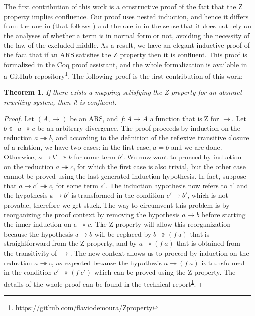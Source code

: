 \documentclass[a4paper]{article}
\newcommand{\tto}{\twoheadrightarrow}
\newcommand{\ott}{\twoheadleftarrow}
\newtheorem{theorem}{Theorem}[section]
\begin{document}
The first contribution of this work is a constructive proof of the
fact that the Z property implies confluence. Our proof uses nested
induction, and hence it differs from the one in \cite{kes09} (that
follows \cite{dehornoy2008z}) and the one in \cite{zproperty} in the
sense that it does not rely on the analyses of whether a term is in
normal form or not, avoiding the necessity of the law of the excluded
middle. As a result, we have an elegant inductive proof of the fact
that if an ARS satisfies the Z property then it is confluent. This
proof is formalized in the Coq proof assistant, and the whole
formalization is available in a GitHub
repository\footnote{\label{fn:github}\url{https://github.com/flaviodemoura/Zproperty}}. The
following proof is the first contribution of this work:
\begin{theorem}\cite{dehornoy2008z}
  If there exists a mapping satisfying the Z property for an abstract
  rewriting system, then it is confluent.
\end{theorem}
\begin{proof}
  Let $(A,\to)$ be an ARS, and $f: A \to A$ a function that is Z for
  $\to$. Let $b \ott a \tto c$ be an arbitrary divergence. The proof
  proceeds by induction on the reduction $a \tto b$, and according to
  the definition of the reflexive transitive closure of a relation, we
  have two cases: in the first case, $a=b$ and we are done. Otherwise,
  $a \to b' \tto b$ for some term $b'$. We now want to proceed by
  induction on the reduction $a \tto c$, for which the first case is
  also trivial, but the other case cannot be proved using the last
  generated induction hypothesis. In fact, suppose that
  $a \to c' \tto c$, for some term $c'$. The induction hypothesis now
  refers to $c'$ and the hypothesis $a \to b'$ is transformed in the
  condition $c' \to b'$, which is not provable, therefore we get
  stuck. The way to circumvent this problem is by reorganizing the
  proof context by removing the hypothesis $a \to b$ before starting
  the inner induction on $a \tto c$. The Z property will allow this
  reorganization because the hypothesis $a \to b$ will be replaced by
  $b \tto (f\ a)$ that is straightforward from the Z property, and by
  $a \tto (f\ a)$ that is obtained from the transitivity of $\to$. The
  new context allows us to proceed by induction on the reduction
  $a \tto c$, as expected because the hypothesis $a \tto (f\ a)$ is
  transformed in the condition $c' \tto (f\ c')$ which can be proved
  using the Z property. The details of the whole proof can be found in
  the technical report\textsuperscript{\ref{fn:github}}.
\end{proof}
  
\end{document}
